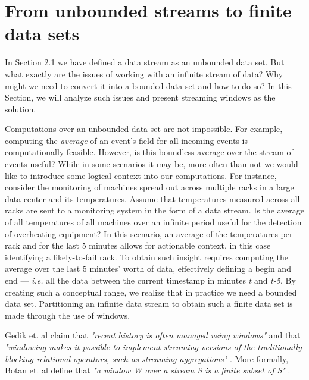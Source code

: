 \section{From unbounded streams to finite data sets} \label{sec:windows}

In Section 2.1 we have defined a data stream as an unbounded data set. But what exactly are the issues of working with an infinite stream of data? Why might we need to convert it into a bounded data set and how to do so? In this Section, we will analyze such issues and present streaming windows as the solution.

Computations over an unbounded data set are not impossible. For example, computing the \textit{average} of an event's field for all incoming events is computationally feasible. However, is this boundless average over the stream of events useful? While in some scenarios it may be, more often than not we would like to introduce some logical context into our computations. For instance, consider the monitoring of machines spread out across multiple racks in a large data center and its temperatures. Assume that temperatures measured across all racks are sent to a monitoring system in the form of a data stream. Is the average of all temperatures of all machines over an infinite period useful for the detection of overheating equipment? In this scenario, an average of the temperatures per rack and for the last 5 minutes allows for actionable context, in this case identifying a likely-to-fail rack. To obtain such insight requires computing the average over the last 5 minutes' worth of data, effectively defining a begin and end --- \textit{i.e.} all the data between the current timestamp in minutes \textit{t} and \textit{t-5}. By creating such a conceptual range, we realize that in practice we need a bounded data set. Partitioning an infinite data stream to obtain such a finite data set is made through the use of windows.

Gedik et. al claim that \textit{"recent history is often managed using windows"} and that \textit{"windowing makes it possible to implement streaming versions of the traditionally blocking relational operators, such as streaming a\cite{Wang-Windows-Stream-Processing}ggregations"} \cite{Wang-Windows-Stream-Processing}. More formally, Botan et. al define that \textit{"a window W over a stream S is a finite subset of S"} \cite{Botan-SECRET}.

